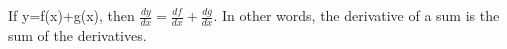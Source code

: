  If y=f(x)+g(x), then $ \frac{dy}{dx} = \frac{df}{dx} + \frac{dg}{dx} . $
In other words, the derivative of a sum is the sum of the 
derivatives.

